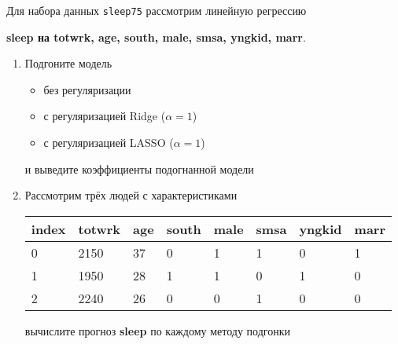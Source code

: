 \begin{exercise}
Для набора данных \texttt{sleep75} рассмотрим линейную регрессию 
\begin{center}
	\textbf{sleep на totwrk, age, south, male, smsa, yngkid, marr}.
\end{center}
\begin{enumerate}
	\item Подгоните модель
	\begin{itemize}
		\item без регуляризации
		\item с регуляризацией Ridge (\(\alpha=1\))
		\item с регуляризацией LASSO (\(\alpha=1\))
	\end{itemize}
	и выведите коэффициенты подогнанной модели
	\item Рассмотрим трёх людей с характеристиками
	\begin{center}
		\begin{tabular}{|l||l|l|l|l|l|l|l|}\hline
			index & totwrk & age & south & male & smsa & yngkid & marr \\ \hline\hline
			0 & 2150 & 37 & 0 & 1 & 1 & 0 & 1 \\
			1 & 1950 & 28 & 1 & 1 & 0 & 1 & 0 \\
			2 & 2240 & 26 & 0 & 0 & 1 & 0 & 0 \\ \hline
		\end{tabular}
	\end{center}
	вычислите прогноз \textbf{sleep} по каждому методу подгонки
\end{enumerate}
\end{exercise}

